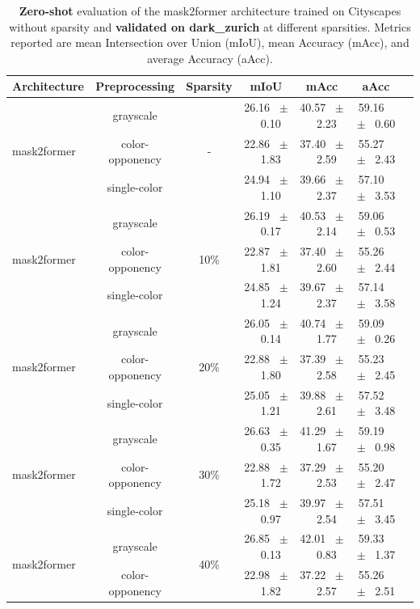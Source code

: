 \begin{table}[h]
  \centering
  \caption{\textbf{Zero-shot} evaluation of the mask2former architecture trained on Cityscapes without sparsity and \textbf{validated on dark_zurich} at different sparsities. Metrics reported are mean Intersection over Union (mIoU), mean Accuracy (mAcc), and average Accuracy (aAcc).}
  \begin{tabular}{@{}lccc ccc@{}}
    \toprule
    Architecture & Preprocessing & Sparsity & mIoU & mAcc & aAcc \\
    \midrule
    \multirow{3}{*}{mask2former} & grayscale & \multirow{3}{*}{-} & 26.16 ~$\pm$~ 0.10 & 40.57 ~$\pm$~ 2.23 & 59.16 ~$\pm$~ 0.60 \\
    & color-opponency &  & 22.86 ~$\pm$~ 1.83 & 37.40 ~$\pm$~ 2.59 & 55.27 ~$\pm$~ 2.43 \\
    & single-color &  & 24.94 ~$\pm$~ 1.10 & 39.66 ~$\pm$~ 2.37 & 57.10 ~$\pm$~ 3.53 \\
    \midrule
    \multirow{3}{*}{mask2former} & grayscale & \multirow{3}{*}{10\%} & 26.19 ~$\pm$~ 0.17 & 40.53 ~$\pm$~ 2.14 & 59.06 ~$\pm$~ 0.53 \\
    & color-opponency &  & 22.87 ~$\pm$~ 1.81 & 37.40 ~$\pm$~ 2.60 & 55.26 ~$\pm$~ 2.44 \\
    & single-color &  & 24.85 ~$\pm$~ 1.24 & 39.67 ~$\pm$~ 2.37 & 57.14 ~$\pm$~ 3.58 \\
    \midrule
    \multirow{3}{*}{mask2former} & grayscale & \multirow{3}{*}{20\%} & 26.05 ~$\pm$~ 0.14 & 40.74 ~$\pm$~ 1.77 & 59.09 ~$\pm$~ 0.26 \\
    & color-opponency &  & 22.88 ~$\pm$~ 1.80 & 37.39 ~$\pm$~ 2.58 & 55.23 ~$\pm$~ 2.45 \\
    & single-color &  & 25.05 ~$\pm$~ 1.21 & 39.88 ~$\pm$~ 2.61 & 57.52 ~$\pm$~ 3.48 \\
    \midrule
    \multirow{3}{*}{mask2former} & grayscale & \multirow{3}{*}{30\%} & 26.63 ~$\pm$~ 0.35 & 41.29 ~$\pm$~ 1.67 & 59.19 ~$\pm$~ 0.98 \\
    & color-opponency &  & 22.88 ~$\pm$~ 1.72 & 37.29 ~$\pm$~ 2.53 & 55.20 ~$\pm$~ 2.47 \\
    & single-color &  & 25.18 ~$\pm$~ 0.97 & 39.97 ~$\pm$~ 2.54 & 57.51 ~$\pm$~ 3.45 \\
    \midrule
    \multirow{3}{*}{mask2former} & grayscale & \multirow{3}{*}{40\%} & 26.85 ~$\pm$~ 0.13 & 42.01 ~$\pm$~ 0.83 & 59.33 ~$\pm$~ 1.37 \\
    & color-opponency &  & 22.98 ~$\pm$~ 1.82 & 37.22 ~$\pm$~ 2.57 & 55.26 ~$\pm$~ 2.51 \\

\end{tabular}
\end{table}
